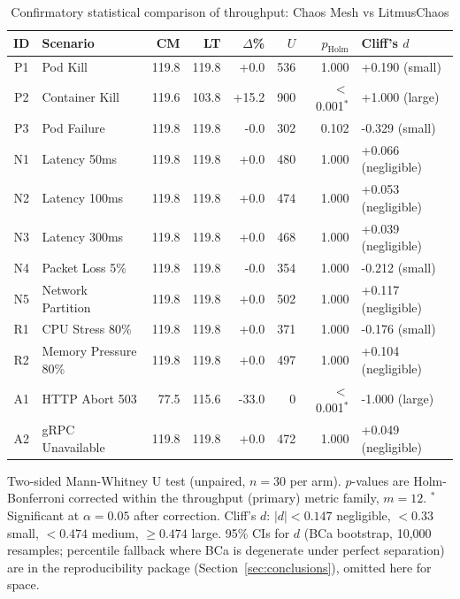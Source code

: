 \begin{table}[ht]
\centering
\caption{Confirmatory statistical comparison of throughput: Chaos Mesh vs LitmusChaos}
\label{tab:stats}
\small
\begin{tabular}{clrrrrrl}
\hline
\textbf{ID} & \textbf{Scenario} & \textbf{CM} & \textbf{LT} & \textbf{$\Delta$\%} & \textbf{$U$} & \textbf{$p_{\mathrm{Holm}}$} & \textbf{Cliff's $d$} \\
\hline
P1 & Pod Kill & 119.8 & 119.8 & +0.0 & 536 & 1.000 & +0.190 (small) \\
P2 & Container Kill & 119.6 & 103.8 & +15.2 & 900 & $<$0.001$^*$ & +1.000 (large) \\
P3 & Pod Failure & 119.8 & 119.8 & -0.0 & 302 & 0.102 & -0.329 (small) \\
N1 & Latency 50ms & 119.8 & 119.8 & +0.0 & 480 & 1.000 & +0.066 (negligible) \\
N2 & Latency 100ms & 119.8 & 119.8 & +0.0 & 474 & 1.000 & +0.053 (negligible) \\
N3 & Latency 300ms & 119.8 & 119.8 & +0.0 & 468 & 1.000 & +0.039 (negligible) \\
N4 & Packet Loss 5\% & 119.8 & 119.8 & -0.0 & 354 & 1.000 & -0.212 (small) \\
N5 & Network Partition & 119.8 & 119.8 & +0.0 & 502 & 1.000 & +0.117 (negligible) \\
R1 & CPU Stress 80\% & 119.8 & 119.8 & +0.0 & 371 & 1.000 & -0.176 (small) \\
R2 & Memory Pressure 80\% & 119.8 & 119.8 & +0.0 & 497 & 1.000 & +0.104 (negligible) \\
A1 & HTTP Abort 503 & 77.5 & 115.6 & -33.0 & 0 & $<$0.001$^*$ & -1.000 (large) \\
A2 & gRPC Unavailable & 119.8 & 119.8 & +0.0 & 472 & 1.000 & +0.049 (negligible) \\
\hline
\end{tabular}
\vspace{2mm}
\raggedright\footnotesize Two-sided Mann-Whitney U test (unpaired, $n=30$ per arm). $p$-values are Holm-Bonferroni corrected within the throughput (primary) metric family, $m=12$. $^*$Significant at $\alpha=0.05$ after correction. Cliff's $d$: $|d|<0.147$ negligible, $<0.33$ small, $<0.474$ medium, $\geq0.474$ large. 95\% CIs for $d$ (BCa bootstrap, 10{,}000 resamples; percentile fallback where BCa is degenerate under perfect separation) are in the reproducibility package (Section~\ref{sec:conclusions}), omitted here for space.
\end{table}